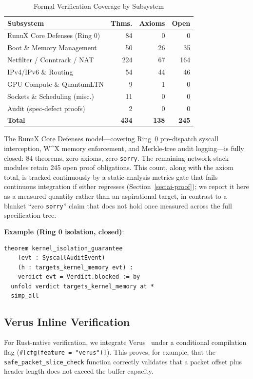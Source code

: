 \documentclass[sigconf,nonacm=false]{acmart}
\begin{document}
\begin{table}[t]
\caption{Formal Verification Coverage by Subsystem}
\label{tab:formal-verification}
\small
\begin{tabular}{lrrr}
\toprule
\textbf{Subsystem} & \textbf{Thms.} & \textbf{Axioms} & \textbf{Open} \\
\midrule
RunuX Core Defenses (Ring 0)  & 84  & 0   & 0 \\
Boot \& Memory Management     & 50  & 26  & 35 \\
Netfilter / Conntrack / NAT   & 224 & 67  & 164 \\
IPv4/IPv6 \& Routing          & 54  & 44  & 46 \\
GPU Compute \& QuantumLTN     & 9   & 1   & 0 \\
Sockets \& Scheduling (misc.) & 11  & 0   & 0 \\
Audit (spec-defect proofs)    & 2   & 0   & 0 \\
\midrule
\textbf{Total}                & \textbf{434} & \textbf{138} & \textbf{245} \\
\bottomrule
\end{tabular}
\end{table}

The RunuX Core Defenses model---covering Ring~0 pre-dispatch syscall interception, W\textasciicircum X memory enforcement, and Merkle-tree audit logging---is fully closed: 84 theorems, zero axioms, zero \texttt{sorry}. The remaining network-stack modules retain 245 open proof obligations. This count, along with the axiom total, is tracked continuously by a static-analysis metrics gate that fails continuous integration if either regresses (Section~\ref{sec:ai-proof}); we report it here as a measured quantity rather than an aspirational target, in contrast to a blanket ``zero \texttt{sorry}'' claim that does not hold once measured across the full specification tree.

\textbf{Example (Ring 0 isolation, closed)}:
\begin{lstlisting}[caption={A fully-proved theorem from the RunuxDefenses model.},label=lst:lean]
theorem kernel_isolation_guarantee
    (evt : SyscallAuditEvent)
    (h : targets_kernel_memory evt) :
    verdict evt = Verdict.blocked := by
  unfold verdict targets_kernel_memory at *
  simp_all
\end{lstlisting}

\subsection{Verus Inline Verification}
For Rust-native verification, we integrate Verus~\cite{Verus2023} under a conditional compilation flag (\texttt{\#[cfg(feature = "verus")]}). This proves, for example, that the \texttt{safe\_packet\_slice\_check} function correctly validates that a packet offset plus header length does not exceed the buffer capacity.
\end{document}
